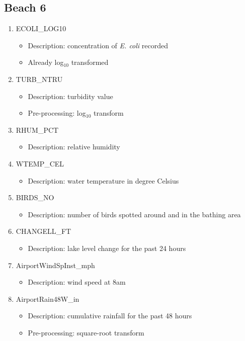 \subsection{Beach 6}
\begin{enumerate}
    \item ECOLI\_LOG10
    \begin{itemize}
        \item Description: concentration of \textit{E. coli} recorded
        \item Already log$_{10}$ transformed
    \end{itemize}
    \item TURB\_NTRU
    \begin{itemize}
        \item Description: turbidity value
        \item Pre-processing: log$_{10}$ transform
    \end{itemize}
    \item RHUM\_PCT
    \begin{itemize}
        \item Description: relative humidity
    \end{itemize}
    \item WTEMP\_CEL
    \begin{itemize}
        \item Description: water temperature in degree Celsius
    \end{itemize}
    \item BIRDS\_NO
    \begin{itemize}
        \item Description: number of birds spotted around and in the bathing area
    \end{itemize}
    \item CHANGELL\_FT
    \begin{itemize}
        \item Description: lake level change for the past 24 hours
    \end{itemize}
    \item AirportWindSpInst\_mph
    \begin{itemize}
        \item Description: wind speed at 8am
    \end{itemize}
    \item AirportRain48W\_in
    \begin{itemize}
        \item Description: cumulative rainfall for the past 48 hours
        \item Pre-processing: square-root transform
    \end{itemize}
\end{enumerate}

